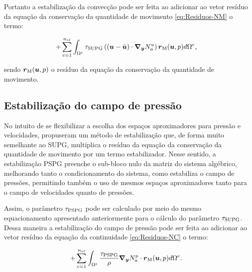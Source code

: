 Portanto a estabilização da convecção pode ser feita ao adicionar ao vetor resíduo da equação da conservação da quantidade de movimento \eqref{eq:Residuos-NM} o termo:

\begin{equation}
    +\sum_{e=1}^{n_{el}}{\int_{\Omega^e}{\tau_{\mathrm{SUPG}}\left({(\boldsymbol{u}-\hat{\boldsymbol{u}})\cdot\boldsymbol{\nabla_y} N_a^u}\right)\boldsymbol{r}_\mathrm{M}(\boldsymbol{u},p) d\Omega^e}}\text{,}\label{eq:EstabConvec}
\end{equation}

\noindent sendo $\boldsymbol{r}_\mathrm{M}(\boldsymbol{u},p)$ o resíduo da equação da conservação da quantidade de movimento.

\subsection{Estabilização do campo de pressão}

No intuito de se flexibilizar a escolha dos espaços aproximadores para pressão e velocidades,  propuseram um método de estabilização que, de forma muito semelhante ao SUPG, multiplica o resíduo da equação da conservação da quantidade de movimento por um termo estabilizador. Nesse sentido, a estabilização PSPG preenche o sub-bloco nulo da matriz do sistema algébrico, melhorando tanto o condicionamento do sistema, como estabiliza o campo de pressões, permitindo também o uso de mesmos espaços aproximadores tanto para o campo de velocidades quanto de pressões.

Assim, o parâmetro $\tau_{\mathrm{PSPG}}$ pode ser calculado por meio do mesmo equacionamento apresentado anteriormente para o cálculo do parâmetro $\tau_{\mathrm{SUPG}}$. Dessa maneira a estabilização do campo de pressão pode ser feita ao adicionar ao vetor resíduo da equação da continuidade \eqref{eq:Residuos-NC} o termo:

\begin{equation}
    +\sum_{e=1}^{n_{el}}{\int_{\Omega^e}{\frac{\tau_{\mathrm{PSPG}}}{\rho}\boldsymbol{\nabla_y} N_a^p\cdot\boldsymbol{r}_\mathrm{M}(\boldsymbol{u},p) d\Omega^e}}\text{.}\label{eq:EstabPress}
\end{equation}






% 


